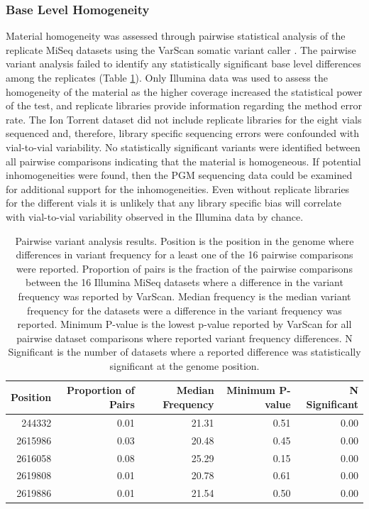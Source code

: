 \documentclass[smallextended]{svjour3}\usepackage[]{graphicx}\usepackage[]{color}
\begin{document}
\subsubsection{Base Level Homogeneity}
Material homogeneity was assessed through pairwise statistical analysis of the replicate MiSeq datasets using the VarScan somatic variant caller \cite{Koboldt2009}. 
The pairwise variant analysis failed to identify any statistically significant base level differences among the replicates (Table \ref{Table:homogeneityTable}).
Only Illumina data was used to assess the homogeneity of the material as the higher coverage increased the statistical power of the test, and replicate libraries provide information regarding the method error rate. 
The Ion Torrent dataset did not include replicate libraries for the eight vials sequenced and, therefore, library specific sequencing errors were confounded with vial-to-vial variability. 
No statistically significant variants were identified between all pairwise comparisons indicating that the material is homogeneous. 
If potential inhomogeneities were found, then the PGM sequencing data could be examined for additional support for the inhomogeneities. 
Even without replicate libraries for the different vials it is unlikely that any library specific bias will correlate with vial-to-vial variability observed in the Illumina data by chance.


\begin{table}[ht]
\centering
\begin{tabular}{rrrrr}
  \hline
Position & Proportion of Pairs & Median Frequency & Minimum P-value & N Significant \\ 
  \hline
244332 & 0.01 & 21.31 & 0.51 & 0.00 \\ 
  2615986 & 0.03 & 20.48 & 0.45 & 0.00 \\ 
  2616058 & 0.08 & 25.29 & 0.15 & 0.00 \\ 
  2619808 & 0.01 & 20.78 & 0.61 & 0.00 \\ 
  2619886 & 0.01 & 21.54 & 0.50 & 0.00 \\ 
   \hline
\end{tabular}
\caption{Pairwise variant analysis results. Position is the position in the genome where differences in variant frequency for a least one of the 16 pairwise comparisons were reported. Proportion of pairs is the fraction of the pairwise comparisons between the 16 Illumina MiSeq datasets where a difference in the variant frequency was reported by VarScan. Median frequency is the median variant frequency for the datasets were a difference in the variant frequency was reported. Minimum P-value is the lowest p-value reported by VarScan for all pairwise dataset comparisons where reported variant frequency differences. N Significant is the number of datasets where a reported difference was statistically significant at the genome position.} 
\label{Table:homogeneityTable}
\end{table}
\end{document}

